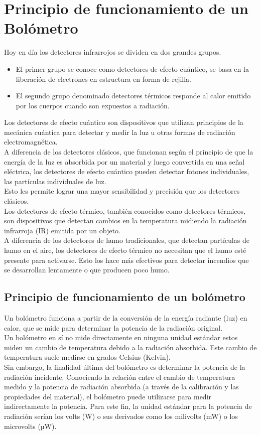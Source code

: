 \documentclass[a4paper,journal]{IEEEtran}
\begin{document}
\section{Principio de funcionamiento de un Bolómetro}
Hoy en día los detectores infrarrojos se dividen en dos grandes grupos.
\begin{itemize}
  \item El primer grupo se conoce como detectores de efecto cuántico, se basa en la liberación de electrones en estructura en forma de rejilla. 
  \item El segundo grupo denominado detectores térmicos responde al calor emitido por los cuerpos cuando son expuestos a radiación. 
\end{itemize}
Los detectores de efecto cuántico son dispositivos que utilizan principios de la mecánica cuántica para detectar y medir la luz u otras formas de radiación electromagnética. \\
A diferencia de los detectores clásicos, que funcionan según el principio de que la energía de la luz es absorbida por un material y luego convertida en una señal eléctrica, los detectores de efecto cuántico pueden detectar fotones individuales, las partículas individuales de luz. 
\\Esto les permite lograr una mayor sensibilidad y precisión que los detectores clásicos.
\\
Los detectores de efecto térmico, también conocidos como detectores térmicos, son dispositivos que detectan cambios en la temperatura midiendo la radiación infrarroja (IR) emitida por un objeto. 
\\A diferencia de los detectores de humo tradicionales, que detectan partículas de humo en el aire, los detectores de efecto térmico no necesitan que el humo esté presente para activarse. Esto los hace más efectivos para detectar incendios que se desarrollan lentamente o que producen poco humo.

\subsection[Principio de funcionamiento de un bolómetro]{Principio de funcionamiento de un bolómetro}
Un bolómetro funciona a partir de la conversión de la energía radiante (luz) en calor, que se mide para determinar la potencia de la radiación original.\\
Un bolómetro en sí no mide directamente en ninguna unidad estándar estos miden un cambio de temperatura debido a la radiación absorbida. Este cambio de temperatura suele medirse en grados Celsius (Kelvin).\\
Sin embargo, la finalidad última del bolómetro es determinar la potencia de la radiación incidente. Conociendo la relación entre el cambio de temperatura medido y la potencia de radiación absorbida (a través de la calibración y las propiedades del material), el bolómetro puede utilizarse para medir indirectamente la potencia. Para este fin, la unidad estándar para la potencia de radiación serían los volts (W) o sus derivados como los milivolts (mW) o los microvolts (µW).\\
\end{document}
